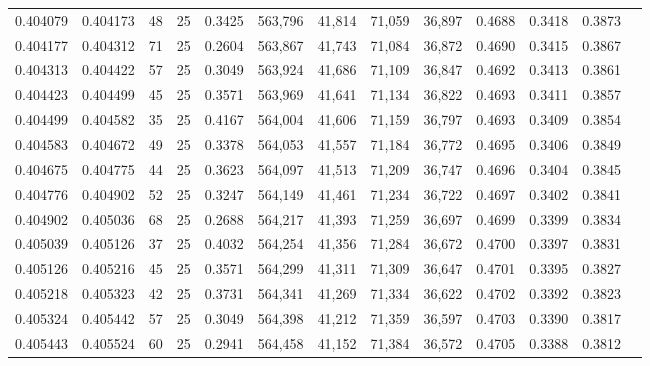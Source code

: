 \begin{tabular}{rrrrrrrrrrrrr}
0.404079 & 0.404173 &    48 &  25 &                                     0.3425 & 563,796 &  41,814 &  71,059 &  36,897 & 0.4688 & 0.3418 & 0.3873 \\
0.404177 & 0.404312 &    71 &  25 &                                     0.2604 & 563,867 &  41,743 &  71,084 &  36,872 & 0.4690 & 0.3415 & 0.3867 \\
0.404313 & 0.404422 &    57 &  25 &                                     0.3049 & 563,924 &  41,686 &  71,109 &  36,847 & 0.4692 & 0.3413 & 0.3861 \\
0.404423 & 0.404499 &    45 &  25 &                                     0.3571 & 563,969 &  41,641 &  71,134 &  36,822 & 0.4693 & 0.3411 & 0.3857 \\
0.404499 & 0.404582 &    35 &  25 &                                     0.4167 & 564,004 &  41,606 &  71,159 &  36,797 & 0.4693 & 0.3409 & 0.3854 \\
0.404583 & 0.404672 &    49 &  25 &                                     0.3378 & 564,053 &  41,557 &  71,184 &  36,772 & 0.4695 & 0.3406 & 0.3849 \\
0.404675 & 0.404775 &    44 &  25 &                                     0.3623 & 564,097 &  41,513 &  71,209 &  36,747 & 0.4696 & 0.3404 & 0.3845 \\
0.404776 & 0.404902 &    52 &  25 &                                     0.3247 & 564,149 &  41,461 &  71,234 &  36,722 & 0.4697 & 0.3402 & 0.3841 \\
0.404902 & 0.405036 &    68 &  25 &                                     0.2688 & 564,217 &  41,393 &  71,259 &  36,697 & 0.4699 & 0.3399 & 0.3834 \\
0.405039 & 0.405126 &    37 &  25 &                                     0.4032 & 564,254 &  41,356 &  71,284 &  36,672 & 0.4700 & 0.3397 & 0.3831 \\
0.405126 & 0.405216 &    45 &  25 &                                     0.3571 & 564,299 &  41,311 &  71,309 &  36,647 & 0.4701 & 0.3395 & 0.3827 \\
0.405218 & 0.405323 &    42 &  25 &                                     0.3731 & 564,341 &  41,269 &  71,334 &  36,622 & 0.4702 & 0.3392 & 0.3823 \\
0.405324 & 0.405442 &    57 &  25 &                                     0.3049 & 564,398 &  41,212 &  71,359 &  36,597 & 0.4703 & 0.3390 & 0.3817 \\
0.405443 & 0.405524 &    60 &  25 &                                     0.2941 & 564,458 &  41,152 &  71,384 &  36,572 & 0.4705 & 0.3388 & 0.3812 \\

\end{tabular}
